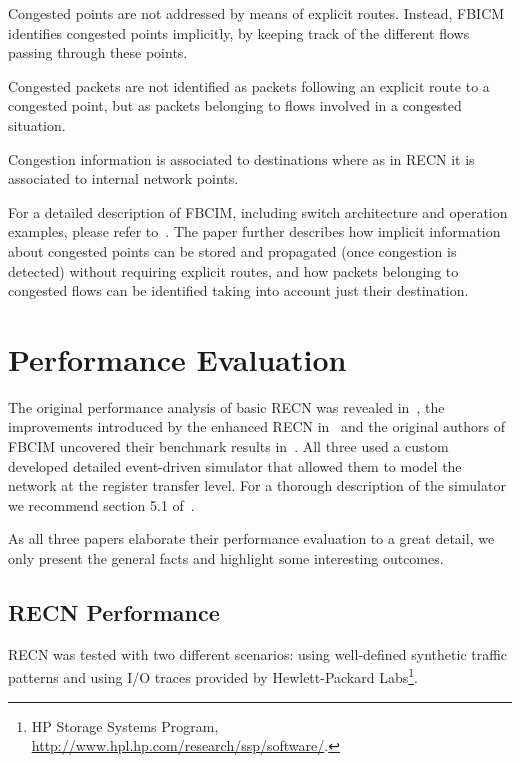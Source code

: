 \documentclass[12pt]{article}
\begin{document}
\begin{list}{.~}{}
\item Congested points are not addressed by means of explicit routes. Instead, FBICM identifies congested points implicitly, by keeping track of the different flows passing through these points.
\item Congested packets are not identified as packets following an explicit route to a congested point, but as packets belonging to flows involved in a congested situation.
\item Congestion information is associated to destinations where as in RECN it is associated
to internal network points.
\end{list}

For a detailed description of FBCIM, including switch architecture and operation examples, please refer to~\cite{paper3}. The paper further describes how implicit information about congested points can be stored and propagated (once congestion is detected) without requiring explicit routes, and how packets belonging to congested flows can be identified taking into account just their destination.

\section{Performance Evaluation}\label{S:performance}

The original performance analysis of basic RECN was revealed in~\cite{paper2}, the improvements introduced by the enhanced RECN in~\cite{paper1} and the original authors of FBCIM uncovered their benchmark results in~\cite{paper3}. All three used a custom developed detailed event-driven simulator that allowed them to model the network at the register transfer level. For a thorough description of the simulator we recommend section 5.1 of~\cite{paper1}.

As all three papers elaborate their performance evaluation to a great detail, we only present the general facts and highlight some interesting outcomes.

\subsection{RECN Performance}\label{S:recn_perf}

RECN was tested with two different scenarios: using well-defined synthetic traffic patterns and using I/O traces provided by Hewlett-Packard Labs\footnote{HP Storage Systems Program, \url{http://www.hpl.hp.com/research/ssp/software/}.}. 
\end{document}
